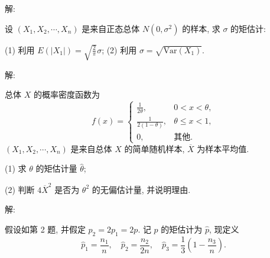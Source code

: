 \documentclass[standard]{ExBook}
\begin{document}
\begin{qitems}
\vspace{-5em}

    \begin{bbox}
解: 
    \end{bbox}

\vspace{-5em}

    \begin{bbox}
    \begin{shaded}
        \qitem
设 \((X_1, X_2, \cdots, X_n)\) 是来自正态总体 \(N(0, \sigma^2)\) 的样本, 求 \(\sigma\) 的矩估计:

(1) 利用 \( E(|X_1|) = \displaystyle\sqrt{\frac{2}{\pi}} \sigma \); \qquad (2) 利用 \(\sigma = \sqrt{\text{Var}(X_1)}\).
    \end{shaded}
    \end{bbox}

\vspace{-5em}

    \begin{bbox}
解: 
    \end{bbox}

\vspace{-5em}

    \begin{bbox}
    \begin{shaded}
        \qitem
总体 \( X \) 的概率密度函数为
\[f(x) =
\begin{cases} 
\displaystyle\frac{1}{2\theta}, & 0 < x < \theta, \\
\displaystyle\frac{1}{2(1-\theta)}, & \theta \leq x < 1, \\
0, & \text{其他}.
\end{cases}\]
\( (X_1, X_2, \cdots, X_n) \) 是来自总体 \( X \) 的简单随机样本, \( \overline{X} \) 为样本平均值.

(1) 求 \( \theta \) 的矩估计量 \( \hat{\theta} \);

(2) 判断 \( 4\overline{X}^2 \) 是否为 \( \theta^2 \) 的无偏估计量, 并说明理由.
    \end{shaded}
    \end{bbox}

\vspace{-5em}

    \begin{bbox}
解: 
    \end{bbox}

\vspace{-5em}

    \begin{bbox}
    \begin{shaded}
        \qitem
假设如第 2 题, 并假定 \( p_2 = 2p_1 = 2p \). 记 \( p \) 的矩估计为 \( \hat{p} \), 现定义
\[\hat{p}_1 = \frac{n_1}{n}, \quad \hat{p}_2 = \frac{n_2}{2n}, \quad \hat{p}_3 = \frac{1}{3} \left( 1 - \frac{n_3}{n} \right).\]


\end{shaded}
\end{bbox}
\end{qitems}
\end{document}
